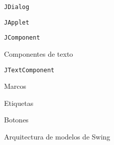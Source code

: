 \begin{longenum}
\begin{longenum}
\begin{longenum}
            \item \texttt{JDialog}
            \item \texttt{JApplet}
        \end{longenum}
        \item \texttt{JComponent}
        \item Componentes de texto
        \begin{longenum}
            \item \texttt{JTextComponent}
        \end{longenum}
        \item Marcos
        \item Etiquetas
        \item Botones
        \item Arquitectura de modelos de Swing
    \end{longenum}
\end{longenum}
